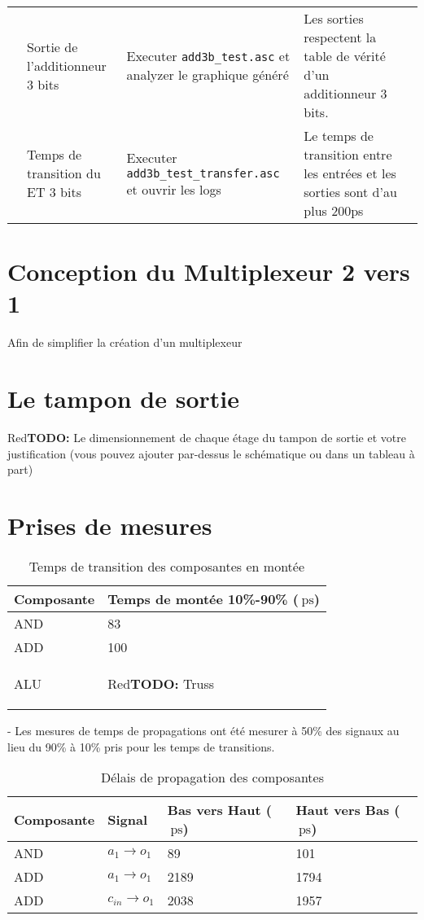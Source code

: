 \documentclass[a11paper]{article}
\newcommand{\todo}[1]{\begin{color}{Red}\textbf{TODO:} #1\end{color}}
\newcommand{\quicktab}[4]{
  \begin{table}[H]
    \centering
    \caption{#1}
    \label{tab:#2}
    \begin{tabular}{#3}
      #4
    \end{tabular}
  \end{table}
}
\newcommand{\cbox}{\fbox{\phantom{\ding{51}}}}
\newcounter{tid}
\newcommand{\tid}{\stepcounter{tid}\thetid}
\begin{document}
\begin{center}
\begin{longtable}{lp{4cm}p{4cm}p{5cm}l}

    \tid &
    Sortie de l'additionneur 3 bits &
		Executer \verb|add3b_test.asc| et analyzer le graphique généré &
		Les sorties respectent la table de vérité d'un additionneur 3 bits. &
		\cbox \\

    \tid &
    Temps de transition du ET 3 bits &
		Executer \verb|add3b_test_transfer.asc| et ouvrir les logs &
		Le temps de transition entre les entrées et les sorties sont d'au plus 200ps &
		\cbox \\


	\end{longtable}
\end{center}

\section{Conception du Multiplexeur 2 vers 1}

Afin de simplifier la création d'un multiplexeur

\section{Le tampon de sortie}
\todo{Le dimensionnement de chaque étage du tampon de sortie et votre justification (vous
pouvez ajouter par-dessus le schématique ou dans un tableau à part)}

\section{Prises de mesures}

\quicktab{Temps de transition des composantes en montée}{ttLH-Sortie}{ll}{
\toprule
Composante & Temps de montée 10\%-90\% ($\SI{}{\pico\s}$) \\
\midrule
AND & 83 \\
ADD & 100 \\ %
ALU & \todo{Truss} \\
\bottomrule
}

- Les mesures de temps de propagations ont été mesurer à 50\% des signaux au lieu du 90\% à 10\% pris pour les temps de transitions.

\quicktab{Délais de propagation des composantes}{propagation}{llll}{
\toprule
Composante & Signal & Bas vers Haut ($\SI{}{\pico\s}$) & Haut vers Bas ($\SI{}{\pico\s}$) \\
\midrule
AND & $a_1 \rightarrow o_1$ & 89 & 101 \\
ADD & $a_1 \rightarrow o_1$ & 2189 & 1794 \\
ADD & $c_{in} \rightarrow o_1$ & 2038 & 1957 \\
\bottomrule
}




\end{document}
